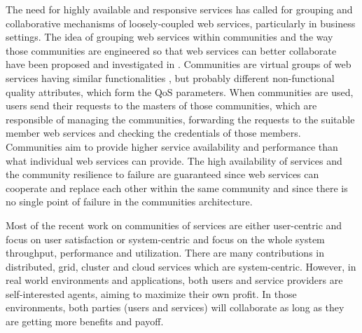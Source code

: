 \documentclass[10pt,journal,cspaper,compsoc]{IEEEtran}
\begin{document}
The need for highly available and responsive services has called
for grouping and collaborative mechanisms of loosely-coupled web
services, particularly in business settings. The idea of grouping
web services within communities and the way those communities are
engineered so that web services can better collaborate have been
proposed and investigated in
\cite{DBLP:journals/ijebr/MaamarSTBB09,DBLP:journals/internet/BenatallahSD03,Rosario:2008:PQS:1512146.1512290}.
Communities are virtual groups of web services having similar
functionalities \cite{Zeng:2003:QDW:775152.775211, Paik:2005:TSS:2229263.2230038,Medjahed05adynamic,10.1109/ARES.2008.7}, but probably different non-functional quality
attributes, which form the QoS parameters. When communities are
used, users send their requests to the masters of those
communities, which are responsible of managing the communities,
forwarding the requests to the suitable member web services and
checking the credentials of those members. Communities aim to
provide higher service availability and performance than what
individual web services can provide. The high availability of
services and the community resilience to failure are guaranteed
since web services can cooperate and replace each other within the
same community and since there is no single point of failure in
the communities architecture.

Most of the recent work on communities of services are either
user-centric and focus on user satisfaction
\cite{Chun02user-centricperformance} or system-centric and focus
on the whole system throughput, performance and utilization. There
are many contributions in distributed, grid, cluster and cloud
services which are system-centric. However, in real world
environments and applications, both users and service providers
are self-interested agents, aiming to maximize their own profit.
In those environments, both parties (users and services) will
collaborate as long as they are getting more benefits and payoff.
\end{document}
